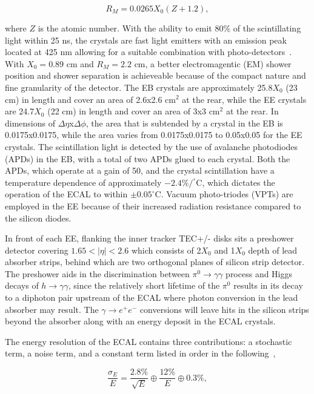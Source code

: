 \begin{equation}
  R_{M} = 0.0265X_{0}(Z+1.2),
\end{equation}

where $Z$ is the atomic number. With the ability to emit $80\%$ of the scintillating light within 25 ns, the crystals are fast light emitters with an emission peak located at 425 nm allowing for a suitable combination with photo-detectors~\cite{Cockerill:2008td}. With $X_0 = 0.89$ cm and $R_M=2.2$ cm, a better electromagentic (EM) shower position and shower separation is achieveable because of the compact nature and fine granularity of the detector. The EB crystals are approximately 25.8$X_0$ (23 cm) in length and cover an area of 2.6x2.6 cm$^2$ at the rear, while the EE crystals are 24.7$X_0$ (22 cm) in length and cover an area of 3x3 cm$^2$ at the rear. In dimensions of $\Delta\eta$x$\Delta\phi$, the area that is subtended by a crystal in the EB is 0.0175x0.0175, while the area varies from 0.0175x0.0175 to 0.05x0.05 for the EE crystals. The scintillation light is detected by the use of avalanche photodiodes (APDs) in the EB, with a total of two APDs glued to each crystal. Both the APDs, which operate at a gain of 50, and the crystal scintillation have a temperature dependence of approximately $-2.4\%/^{\circ}$C, which dictates the operation of the ECAL to within $\pm0.05^{\circ}$C. Vacuum photo-triodes (VPTs) are employed in the EE because of their increased radiation resistance compared to the silicon diodes. 

In front of each EE, flanking the inner tracker TEC+/- disks sits a preshower detector covering $1.65<|\eta|<2.6$ which consists of 2$X_0$ and 1$X_0$ depth of lead absorber strips, behind which are two orthogonal planes of silicon strip detector. The preshower aids in the discrimination between $\pi^0\rightarrow\gamma\gamma$ process and Higgs decays of $h\rightarrow\gamma\gamma$, since the relatively short lifetime of the $\pi^0$ results in its decay to a diphoton pair upstream of the ECAL where photon conversion in the lead absorber may result. The $\gamma\rightarrow e^+e^-$ conversions will leave hits in the silicon strips beyond the absorber along with an energy deposit in the ECAL crystals.

The energy resolution of the ECAL contains three contributions: a stochastic term, a noise term, and a constant term listed in order in the following~\cite{Chatrchyan:2013dga},

\begin{equation}
 \frac{\sigma_{E}}{E} = \frac{2.8\%}{\sqrt{E}} \oplus \frac{12\%}{E} \oplus 0.3\%,
\end{equation}

